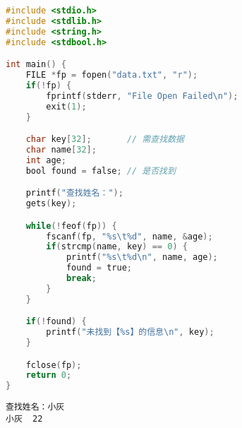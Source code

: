 \begin{lstlisting}[language=C, title=feof.c]
#include <stdio.h>
#include <stdlib.h>
#include <string.h>
#include <stdbool.h>

int main() {
    FILE *fp = fopen("data.txt", "r");
    if(!fp) {
        fprintf(stderr, "File Open Failed\n");
        exit(1);
    }

    char key[32];       // 需查找数据
    char name[32];
    int age;
    bool found = false; // 是否找到

    printf("查找姓名：");
    gets(key);

    while(!feof(fp)) {
        fscanf(fp, "%s\t%d", name, &age);
        if(strcmp(name, key) == 0) {
            printf("%s\t%d\n", name, age);
            found = true;
            break;
        }
    }

    if(!found) {
        printf("未找到【%s】的信息\n", key);
    }

    fclose(fp);
    return 0;
}
\end{lstlisting}

\begin{tcolorbox}
    \begin{verbatim}
查找姓名：小灰
小灰	22
	\end{verbatim}
\end{tcolorbox}

\newpage